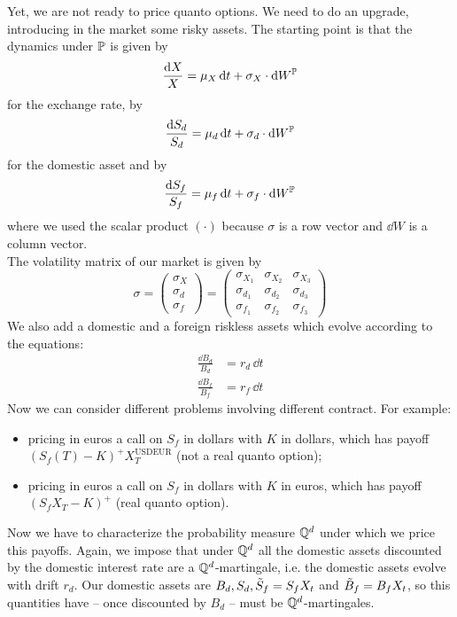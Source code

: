 Yet, we are not ready to price quanto options. We need to do an upgrade, introducing in the market some risky assets. The starting point is that the dynamics under $\mathbb{P}$ is given by
\begin{equation}
    \frac{\dd X}{X} = \mu_X\,\dd t + \sigma_X\cdot\dd W^{\mathbb{P}}
\end{equation}
for the exchange rate, by
\begin{equation}\label{Sd}
    \frac{\dd S_d}{S_d} = \mu_d\,\dd t + \sigma_d\cdot\dd W^{\mathbb{P}}
\end{equation}\label{Sf}
for the domestic asset and by
\begin{equation}
    \frac{\dd S_f}{S_f} = \mu_f\,\dd t + \sigma_f\cdot\dd W^{\mathbb{P}}
\end{equation}
where we used the scalar product $(\cdot)$ because $\sigma$ is a row vector and $\dd W$ is a column vector.\\
The volatility matrix of our market is given by
\begin{equation}
    \sigma =
    \begin{pmatrix}
    \sigma_X \\ \sigma_d \\ \sigma_f
    \end{pmatrix} =
    \begin{pmatrix}
    \sigma_{X_1} & \sigma_{X_2} & \sigma_{X_3} \\
    \sigma_{d_1} & \sigma_{d_2} & \sigma_{d_3} \\
    \sigma_{f_1} & \sigma_{f_2} & \sigma_{f_3}
    \end{pmatrix}
\end{equation}
We also add a domestic and a foreign riskless assets which evolve according to the equations:
\begin{align}
    \frac{\dd B_d}{B_d} &= r_d\,\dd t \\
    \frac{\dd B_f}{B_f} &= r_f\,\dd t
\end{align}
Now we can consider different problems involving different contract. For example:
\begin{itemize}
    \item pricing in euros a call on $S_f$ in dollars with $K$ in dollars, which has payoff $(S_f(T)-K)^+X_T^{\text{USDEUR}}$ (not a real quanto option);
    \item pricing in euros a call on $S_f$ in dollars with $K$ in euros, which has payoff $(S_fX_T-K)^+$ (real quanto option).
\end{itemize}
Now we have to characterize the probability measure $\mathbb{Q}^d$ under which we price this payoffs. Again, we impose that under $\mathbb{Q}^d$ all the domestic assets discounted by the domestic interest rate are a $\mathbb{Q}^d$-martingale, i.e. the domestic assets evolve with drift $r_d$. Our domestic assets are $B_d, S_d, \Tilde{S}_f = S_fX_t$ and $\Tilde{B}_f = B_fX_t$, so this quantities have -- once discounted by $B_d$ -- must be $\mathbb{Q}^d$-martingales.\\
